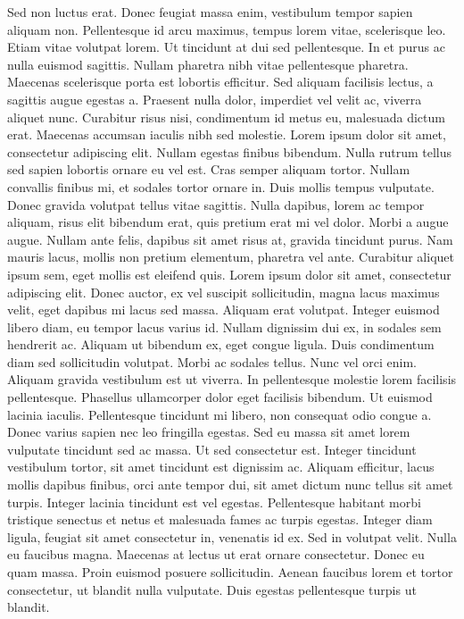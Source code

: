 {Sed non luctus erat. Donec feugiat massa enim, vestibulum tempor sapien aliquam non. Pellentesque id arcu maximus, tempus lorem vitae, scelerisque leo. Etiam vitae volutpat lorem. Ut tincidunt at dui sed pellentesque. In et purus ac nulla euismod sagittis. Nullam pharetra nibh vitae pellentesque pharetra. Maecenas scelerisque porta est lobortis efficitur. Sed aliquam facilisis lectus, a sagittis augue egestas a. Praesent nulla dolor, imperdiet vel velit ac, viverra aliquet nunc. Curabitur risus nisi, condimentum id metus eu, malesuada dictum erat. Maecenas accumsan iaculis nibh sed molestie. Lorem ipsum dolor sit amet, consectetur adipiscing elit. Nullam egestas finibus bibendum. Nulla rutrum tellus sed sapien lobortis ornare eu vel est.
Cras semper aliquam tortor. Nullam convallis finibus mi, et sodales tortor ornare in. Duis mollis tempus vulputate. Donec gravida volutpat tellus vitae sagittis. Nulla dapibus, lorem ac tempor aliquam, risus elit bibendum erat, quis pretium erat mi vel dolor. Morbi a augue augue. Nullam ante felis, dapibus sit amet risus at, gravida tincidunt purus. Nam mauris lacus, mollis non pretium elementum, pharetra vel ante. Curabitur aliquet ipsum sem, eget mollis est eleifend quis.
Lorem ipsum dolor sit amet, consectetur adipiscing elit. Donec auctor, ex vel suscipit sollicitudin, magna lacus maximus velit, eget dapibus mi lacus sed massa. Aliquam erat volutpat. Integer euismod libero diam, eu tempor lacus varius id. Nullam dignissim dui ex, in sodales sem hendrerit ac. Aliquam ut bibendum ex, eget congue ligula. Duis condimentum diam sed sollicitudin volutpat. Morbi ac sodales tellus. Nunc vel orci enim. Aliquam gravida vestibulum est ut viverra. In pellentesque molestie lorem facilisis pellentesque. Phasellus ullamcorper dolor eget facilisis bibendum. Ut euismod lacinia iaculis. Pellentesque tincidunt mi libero, non consequat odio congue a. Donec varius sapien nec leo fringilla egestas. Sed eu massa sit amet lorem vulputate tincidunt sed ac massa.
Ut sed consectetur est. Integer tincidunt vestibulum tortor, sit amet tincidunt est dignissim ac. Aliquam efficitur, lacus mollis dapibus finibus, orci ante tempor dui, sit amet dictum nunc tellus sit amet turpis. Integer lacinia tincidunt est vel egestas. Pellentesque habitant morbi tristique senectus et netus et malesuada fames ac turpis egestas. Integer diam ligula, feugiat sit amet consectetur in, venenatis id ex. Sed in volutpat velit. Nulla eu faucibus magna. Maecenas at lectus ut erat ornare consectetur. Donec eu quam massa. Proin euismod posuere sollicitudin. Aenean faucibus lorem et tortor consectetur, ut blandit nulla vulputate. Duis egestas pellentesque turpis ut blandit.
}
